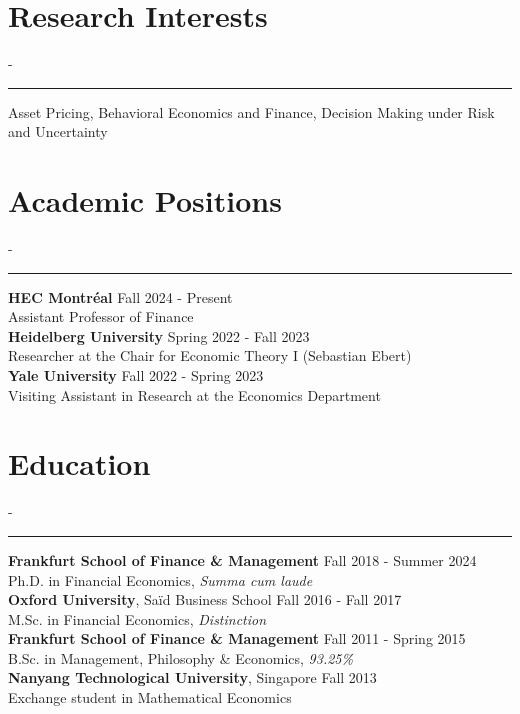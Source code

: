 \documentclass{res}
\newcommand{\sectionline}{	\vspace{-8pt}
	{\parindent-\sectionwidth \rule{\resumewidth}{0.4pt}} }
\begin{document}
 


\address{HEC Montréal\\3000, chemin de la Côte-Sainte-Catherine\\Montréal (Québec)\\Canada H3T 2A7}
\address{Phone: +1 514 340-6424\\ E-mail: maximilian.voigt@hec.ca\\ \href{https://maxvoigt.github.io}{Personal website}}
                                  
\begin{resume}

\section{Research Interests}
    \sectionline
	Asset Pricing, 
    Behavioral Economics and Finance, Decision Making under Risk and Uncertainty
 
\section{Academic Positions} 	
	\sectionline
	\textbf{HEC Montréal} \hfill Fall 2024 - Present \\
    Assistant Professor of Finance \medskip \\
	\textbf{Heidelberg University} \hfill Spring 2022 - Fall 2023\\
	Researcher at the Chair for Economic Theory I (Sebastian Ebert)  \medskip \\
	\textbf{Yale University}  \hfill Fall 2022 - Spring 2023\\
	Visiting Assistant in Research at the Economics Department 

\section{Education} 	
	\sectionline
	\textbf{Frankfurt School of Finance \& Management} \hfill Fall 2018 - Summer 2024 \\
    Ph.D. in Financial Economics, \textit{Summa cum laude} \medskip \\   
	\textbf{Oxford University}, Sa\"{i}d Business School \hfill Fall 2016 - Fall 2017\\
    M.Sc. in Financial Economics, \textit{Distinction} \medskip \\
	\textbf{Frankfurt School of Finance \& Management} \hfill Fall 2011 - Spring 2015\\
    B.Sc. in Management, Philosophy \& Economics, \textit{93.25\%} \medskip \\  
	\textbf{Nanyang Technological University}, Singapore \hfill Fall 2013 \\
    Exchange student in Mathematical Economics
     

\end{resume}
\end{document}
